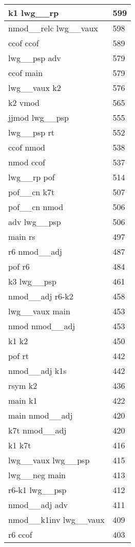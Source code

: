 \documentclass[a4 paper]{article}
\begin{document}
\begin{longtable}{p{}p{}}
k1 lwg\_\_rp  & 599 \\ \midrule
nmod\_\_relc lwg\_\_vaux  & 598 \\ \midrule
ccof ccof  & 589 \\ \midrule
lwg\_\_psp adv  & 579 \\ \midrule
ccof main  & 579 \\ \midrule
lwg\_\_vaux k2  & 576 \\ \midrule
k2 vmod  & 565 \\ \midrule
jjmod lwg\_\_psp  & 555 \\ \midrule
lwg\_\_psp rt  & 552 \\ \midrule
ccof nmod  & 538 \\ \midrule
nmod ccof  & 537 \\ \midrule
lwg\_\_rp pof  & 514 \\ \midrule
pof\_\_cn k7t  & 507 \\ \midrule
pof\_\_cn nmod  & 506 \\ \midrule
adv lwg\_\_psp  & 506 \\ \midrule
main rs  & 497 \\ \midrule
r6 nmod\_\_adj  & 487 \\ \midrule
pof r6  & 484 \\ \midrule
k3 lwg\_\_psp  & 461 \\ \midrule
nmod\_\_adj r6-k2  & 458 \\ \midrule
lwg\_\_vaux main  & 453 \\ \midrule
nmod nmod\_\_adj  & 453 \\ \midrule
k1 k2  & 450 \\ \midrule
pof rt  & 442 \\ \midrule
nmod\_\_adj k1s  & 442 \\ \midrule
rsym k2  & 436 \\ \midrule
main k1  & 422 \\ \midrule
main nmod\_\_adj  & 420 \\ \midrule
k7t nmod\_\_adj  & 420 \\ \midrule
k1 k7t  & 416 \\ \midrule
lwg\_\_vaux lwg\_\_psp  & 415 \\ \midrule
lwg\_\_neg main  & 413 \\ \midrule
r6-k1 lwg\_\_psp  & 412 \\ \midrule
nmod\_\_adj adv  & 411 \\ \midrule
nmod\_\_k1inv lwg\_\_vaux  & 409 \\ \midrule
r6 ccof  & 403 \\ \midrule

\end{longtable}
\end{document}
